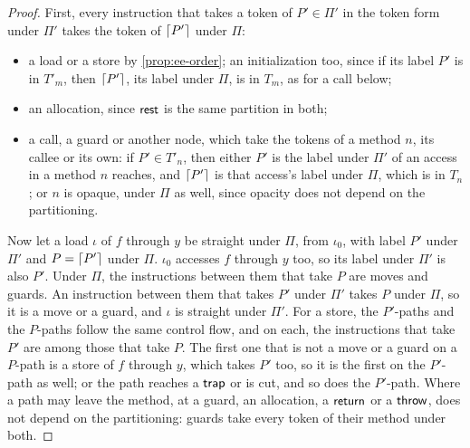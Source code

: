 \begin{proof}
First, every instruction that takes a token of $P' \in \Pi'$ in the token form
under $\Pi'$ takes the token of $\lceil P' \rceil$ under $\Pi$:
\begin{itemize}
\item a load or a store by \cref{prop:ee-order}; an initialization too, since
  if its label $P'$ is in $T'_m$, then $\lceil P' \rceil$, its label under $\Pi$, is in
  $T_m$, as for a call below;
\item an allocation, since $\mathsf{rest}$ is the same partition in both;
\item a call, a guard or another node, which take the tokens of a method $n$,
  its callee or its own: if $P' \in T'_n$, then either $P'$ is the label under
  $\Pi'$ of an access in a method $n$ reaches, and $\lceil P' \rceil$ is that access's
  label under $\Pi$, which is in $T_n$; or $n$ is opaque, under $\Pi$ as well,
  since opacity does not depend on the partitioning.
\end{itemize}
Now let a load $\iota$ of $f$ through $y$ be straight under $\Pi$, from
$\iota_0$, with label $P'$ under $\Pi'$ and $P = \lceil P' \rceil$ under $\Pi$.
$\iota_0$ accesses $f$ through $y$ too, so its label under $\Pi'$ is also $P'$.
Under $\Pi$, the instructions between them that take $P$ are moves and guards.
An instruction between them that takes $P'$ under $\Pi'$ takes $P$ under $\Pi$,
so it is a move or a guard, and $\iota$ is straight under $\Pi'$.
For a store, the $P'$-paths and the $P$-paths follow the same control flow,
and on each, the instructions that take $P'$ are among those that take $P$. The
first one that is not a move or a guard on a $P$-path is a store of $f$ through
$y$, which takes $P'$ too, so it is the first on the $P'$-path as well; or the
path reaches a $\mathsf{trap}$ or is cut, and so does the $P'$-path. Where a path may
leave the method, at a guard, an allocation, a $\mathsf{return}$ or a $\mathsf{throw}$, does not
depend on the partitioning: guards take every token of their method under both.
\end{proof}

